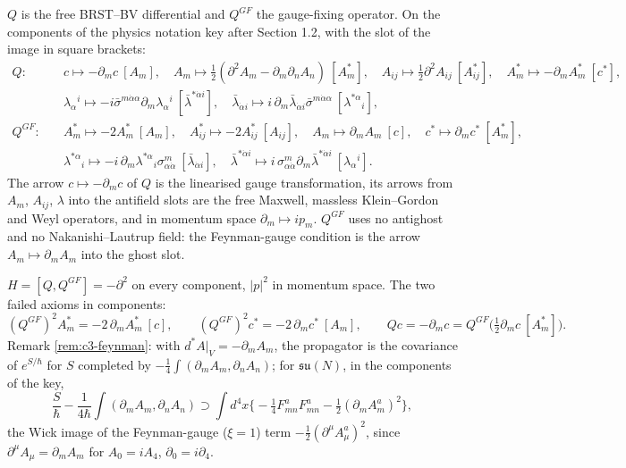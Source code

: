 \begin{remark}
$Q$ is the free BRST--BV differential and $Q^{GF}$ the gauge-fixing operator. On the components of the physics notation key after Section 1.2, with the slot of the image in square brackets:
\[
\begin{aligned}
Q:&\quad c\mapsto-\partial_mc\ [A_m],\quad A_m\mapsto\tfrac12(\partial^2A_m-\partial_m\partial_nA_n)\ [A^*_m],\quad A_{ij}\mapsto\tfrac12\partial^2A_{ij}\ [A^*_{ij}],\quad A^*_m\mapsto-\partial_mA^*_m\ [c^*],\\
&\quad \lambda_\alpha{}^i\mapsto-i\bar\sigma^{m\dot\alpha\alpha}\partial_m\lambda_\alpha{}^i\ [\bar\lambda^{*\dot\alpha i}],\quad \bar\lambda_{\dot\alpha i}\mapsto i\,\partial_m\bar\lambda_{\dot\alpha i}\bar\sigma^{m\dot\alpha\alpha}\ [\lambda^{*\alpha}{}_i],\\
Q^{GF}:&\quad A^*_m\mapsto-2A^*_m\ [A_m],\quad A^*_{ij}\mapsto-2A^*_{ij}\ [A_{ij}],\quad A_m\mapsto\partial_mA_m\ [c],\quad c^*\mapsto\partial_mc^*\ [A^*_m],\\
&\quad \lambda^{*\alpha}{}_i\mapsto-i\,\partial_m\lambda^{*\alpha}{}_i\sigma^m_{\alpha\dot\alpha}\ [\bar\lambda_{\dot\alpha i}],\quad \bar\lambda^{*\dot\alpha i}\mapsto i\,\sigma^m_{\alpha\dot\alpha}\partial_m\bar\lambda^{*\dot\alpha i}\ [\lambda_\alpha{}^i].
\end{aligned}
\]
The arrow $c\mapsto-\partial_mc$ of $Q$ is the linearised gauge transformation, its arrows from $A_m$, $A_{ij}$, $\lambda$ into the antifield slots are the free Maxwell, massless Klein--Gordon and Weyl operators, and in momentum space $\partial_m\mapsto ip_m$. $Q^{GF}$ uses no antighost and no Nakanishi--Lautrup field: the Feynman-gauge condition is the arrow $A_m\mapsto\partial_mA_m$ into the ghost slot.
\end{remark}

\begin{remark}
$H=[Q,Q^{GF}]=-\partial^2$ on every component, $|p|^2$ in momentum space. The two failed axioms in components:
\[
(Q^{GF})^2A^*_m=-2\,\partial_mA^*_m\ [c],\qquad (Q^{GF})^2c^*=-2\,\partial_mc^*\ [A_m],\qquad Qc=-\partial_mc=Q^{GF}\big(\tfrac12\partial_mc\ [A^*_m]\big).
\]
Remark \ref{rem:c3-feynman}: with $d^*A|_V=-\partial_mA_m$, the propagator is the covariance of $e^{S/\hbar}$ for $S$ completed by $-\tfrac14\int(\partial_mA_m,\partial_nA_n)$; for $\mathfrak{su}(N)$, in the components of the key,
\[
\frac S\hbar-\frac1{4\hbar}\int(\partial_mA_m,\partial_nA_n)\supset\int d^4x\Big\{-\tfrac14F^a_{mn}F^a_{mn}-\tfrac12(\partial_mA^a_m)^2\Big\},
\]
the Wick image of the Feynman-gauge ($\xi=1$) term $-\tfrac12(\partial^\mu A^a_\mu)^2$, since $\partial^\mu A_\mu=\partial_mA_m$ for $A_0=iA_4$, $\partial_0=i\partial_4$.
\end{remark}

